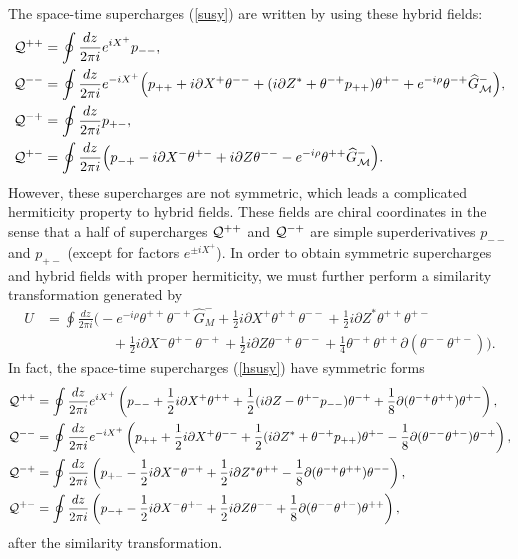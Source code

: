 \documentclass[a4paper,seceq,preprint]{ptptex}
\newcommand{\dz}{\frac{dz}{2\pi i}}
\begin{document}
The space-time supercharges (\ref{susy}) are written 
by using these hybrid fields: 
\begin{align}
 {\cal Q}^{++}&=\oint\dz e^{iX^+}p_{--},\nonumber\\
 {\cal Q}^{--}&=\oint\dz e^{-iX^+}\Big(
p_{++}+i\partial X^+\theta^{--}
+(i\partial Z^*+\theta^{-+}p_{++})\theta^{+-}
+e^{-i\rho}\theta^{-+}\widehat G^-_{\cal M}\Big),
\nonumber\\
 {\cal Q}^{-+}&=\oint\dz p_{+-},\nonumber\\
 {\cal Q}^{+-}&=\oint\dz\Big(
p_{-+}-i\partial X^-\theta^{+-}
+i\partial Z\theta^{--}
-e^{-i\rho}\theta^{++}\widehat G^-_{\cal M}\Big).\label{hsusy}
\end{align}
However, these supercharges are not symmetric,
which leads a complicated hermiticity property
to hybrid fields.\cite{Bherm} These fields are
chiral coordinates in the sense that a half of supercharges 
${\cal Q}^{++}$ and ${\cal Q}^{-+}$ are simple 
superderivatives $p_{--}$ and $p_{+-}$ (except for 
factors $e^{\pm iX^+}$). 
In order to obtain symmetric supercharges and hybrid fields
with proper hermiticity, we must further perform a similarity 
transformation generated by
\begin{align}
  U&=\oint\dz\Bigg(-e^{-i\rho}\theta^{++}\theta^{-+}\widehat G^-_M
+\frac{1}{2}i\partial X^+\theta^{++}\theta^{--}
+\frac{1}{2}i\partial Z^*\theta^{++}\theta^{+-}
\nonumber\\
&\hspace{2cm}
+\frac{1}{2}i\partial X^-\theta^{+-}\theta^{-+}
+\frac{1}{2}i\partial Z\theta^{-+}\theta^{--}
+\frac{1}{4}\theta^{-+}\theta^{++}\partial(\theta^{--}\theta^{+-})
\Bigg).\label{similar}
\end{align}
In fact, the space-time supercharges (\ref{hsusy})
have symmetric forms
\begin{align}
{\cal Q}^{++}&=\oint\dz e^{iX^+}\left(
p_{--}+\frac{1}{2}i\partial X^+\theta^{++}+
\frac{1}{2}(i\partial Z-\theta^{+-}p_{--})\theta^{-+}
+\frac{1}{8}\partial(\theta^{-+}\theta^{++})
\theta^{+-}\right),\nonumber\\
{\cal Q}^{--}&=\oint\dz e^{-iX^+}\left(
p_{++}+\frac{1}{2}i\partial X^+\theta^{--}+
\frac{1}{2}(i\partial Z^*+\theta^{-+}p_{++})\theta^{+-}
-\frac{1}{8}\partial(\theta^{--}\theta^{+-})\theta^{-+}\right),
\nonumber\\
{\cal Q}^{-+}&=\oint\dz\left(
p_{+-}-\frac{1}{2}i\partial X^-\theta^{-+}+
\frac{1}{2}i\partial Z^*\theta^{++}
-\frac{1}{8}\partial(\theta^{-+}\theta^{++})\theta^{--}\right),
\nonumber\\
{\cal Q}^{+-}&=\oint\dz\left(
p_{-+}-\frac{1}{2}i\partial X^-\theta^{+-}+
\frac{1}{2}i\partial Z\theta^{--}
+\frac{1}{8}\partial(\theta^{--}\theta^{+-})\theta^{++}\right),
\label{susyh}
\end{align}
after the similarity transformation.
\end{document}

